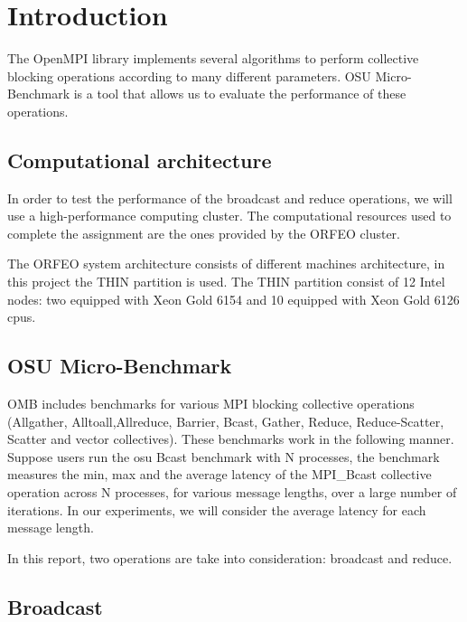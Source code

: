 \section{Introduction}

The OpenMPI library implements several algorithms to perform collective blocking operations according to many different parameters.
OSU Micro-Benchmark is a tool that allows us to evaluate the performance of these operations.

\subsection{Computational architecture}

In order to test the performance of the broadcast and reduce operations, we will use a high-performance computing cluster. The computational resources used to complete the assignment are the ones provided by the ORFEO cluster.

The ORFEO system architecture consists of different machines architecture, in this project the THIN partition is used. The THIN partition consist of 12 Intel nodes: two equipped with Xeon Gold 6154 and 10 equipped with Xeon Gold 6126 cpus.

\subsection{OSU Micro-Benchmark}

OMB includes benchmarks for various MPI blocking
collective operations (Allgather, Alltoall,Allreduce, Barrier, Bcast, Gather, Reduce, Reduce-Scatter, Scatter and vector collectives). These benchmarks work in the following manner. Suppose users run the osu Bcast benchmark with N processes, the benchmark measures the min, max and the average latency of the MPI\_Bcast collective operation across N processes, for various message lengths, over a large number of iterations. In our experiments, we will consider the average latency for each message length.

In this report, two operations are take into consideration: broadcast and reduce.


\subsection{Broadcast}

